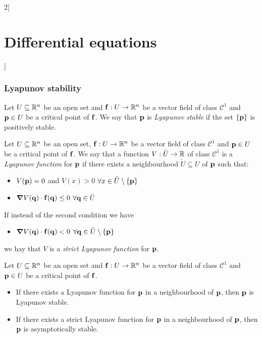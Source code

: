 \documentclass[../../../main.tex]{subfiles}
\begin{document}
\begin{multicols}{2}[\section{Differential equations}]
  \subsubsection{Lyapunov stability}
  \begin{definition}
    Let $U\subseteq \mathbb{R}^n$ be an open set and $\boldsymbol{\mathrm{f}}:U\rightarrow\mathbb{R}^n$ be a vector field of class $\mathcal{C}^1$ and $\boldsymbol{\mathrm{p}}\in U$ be a critical point of $\boldsymbol{\mathrm{f}}$. We say that $\boldsymbol{\mathrm{p}}$ is \emph{Lyapunov stable} if the set $\{\boldsymbol{\mathrm{p}}\}$ is positively stable.
  \end{definition}
  \begin{definition}
    Let $U\subseteq \mathbb{R}^n$ be an open set, $\boldsymbol{\mathrm{f}}:U\rightarrow\mathbb{R}^n$ be a vector field of class $\mathcal{C}^1$ and $\boldsymbol{\mathrm{p}}\in U$ be a critical point of $\boldsymbol{\mathrm{f}}$. We say that a function $V:\tilde{U}\rightarrow\mathbb{R}$ of class $\mathcal{C}^1$ is a \emph{Lyapunov function} for $\boldsymbol{\mathrm{p}}$ if there exists a neighbourhood $\tilde{U}\subseteq U$ of $\boldsymbol{\mathrm{p}}$ such that:
    \begin{itemize}
      \item $V(\boldsymbol{\mathrm{p}})=0$ and $V(x)>0$ $\forall x\in\tilde{U}\setminus\{\boldsymbol{\mathrm{p}}\}$
      \item $\grad V(\boldsymbol{\mathrm{q}})\cdot \boldsymbol{\mathrm{f}}(\boldsymbol{\mathrm{q}})\leq 0$ $\forall \boldsymbol{\mathrm{q}}\in \tilde{U}$
    \end{itemize}
    If instead of the second condition we have
    \begin{itemize}
      \item $\grad V(\boldsymbol{\mathrm{q}})\cdot \boldsymbol{\mathrm{f}}(\boldsymbol{\mathrm{q}})<0$ $\forall \boldsymbol{\mathrm{q}}\in \tilde{U}\setminus\{\boldsymbol{\mathrm{p}}\}$
    \end{itemize}
    we hay that $V$ is a \emph{strict Lyapunov function} for $\boldsymbol{\mathrm{p}}$.
  \end{definition}
  \begin{theorem}
    Let $U\subseteq \mathbb{R}^n$ be an open set and $\boldsymbol{\mathrm{f}}:U\rightarrow\mathbb{R}^n$ be a vector field of class $\mathcal{C}^1$ and $\boldsymbol{\mathrm{p}}\in U$ be a critical point of $\boldsymbol{\mathrm{f}}$.
    \begin{itemize}
      \item If there exists a Lyapunov function for $\boldsymbol{\mathrm{p}}$ in a neighbourhood of $\boldsymbol{\mathrm{p}}$, then $\boldsymbol{\mathrm{p}}$ is Lyapunov stable.
      \item If there exists a strict Lyapunov function for $\boldsymbol{\mathrm{p}}$ in a neighbourhood of $\boldsymbol{\mathrm{p}}$, then $\boldsymbol{\mathrm{p}}$ is asymptotically stable.
    \end{itemize}
  \end{theorem}
  \begin{theorem}

\end{theorem}
\end{multicols}
\end{document}
